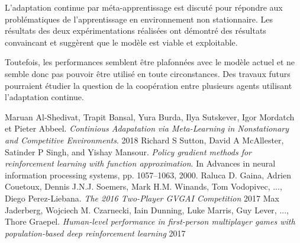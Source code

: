 \documentclass[a4paper,11pt]{article}
\begin{document}
    L'adaptation continue par méta-apprentissage est discuté pour répondre aux problématiques de l'apprentissage
    en environnement non stationnaire. Les résultats des deux expérimentations réalisées ont démontré
    des résultats convaincant et suggèrent que le modèle est viable et exploitable.

    Toutefois, les performances semblent être plafonnées avec le modèle actuel et ne semble donc pas 
    pouvoir être utilisé en toute circonstances. Des travaux futurs pourraient étudier la question de 
    la coopération entre plusieurs agents utilisant l'adaptation continue.

    \begin{thebibliography}{9}
        Maruan Al-Shedivat, Trapit Bansal, Yura Burda, Ilya Sutskever, Igor Mordatch et Pieter Abbeel.
        \emph{Continious Adapatation via Meta-Learning in Nonstationary and Competitive Environments}.
        2018
        Richard S Sutton, David A McAllester, Satinder P Singh, and Yishay Mansour.
        \emph{Policy gradient methods for reinforcement learning with function approximation}.
        In Advances in neural information processing systems, pp. 1057–1063, 2000.
        Raluca D. Gaina, Adrien Couetoux, Dennis J.N.J. Soemers, Mark H.M. Winands, Tom Vodopivec, ..., Diego Perez-Liebana.
        \emph{The 2016 Two-Player GVGAI Competition}
        2017
         Max Jaderberg, Wojciech M. Czarnecki, Iain Dunning, Luke Marris, Guy Lever, ..., Thore Graepel.
        \emph{Human-level performance in first-person multiplayer games with population-based deep reinforcement learning}
        2017
  
    \end{thebibliography}




 
  
\end{document}
